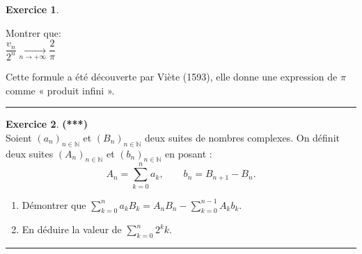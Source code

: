 \documentclass[a4paper,11pt]{article}
\theoremstyle{definition}
\newtheorem{exo}{Exercice} %
\begin{document}
\begin{minipage}[c]{1\linewidth}
\begin{minipage}[c]{0.48\linewidth}
\begin{exo}
\begin{enumerate}
				\raggedright Montrer que: \quad\\[0.25cm]
				
				\centering$ \dfrac{v_n}{2^n} \underset{n \rightarrow +\infty}{\longrightarrow} \dfrac{2}{\pi}$\quad\\[0.35cm]
				
				\raggedright Cette formule a été découverte par Viète (1593), elle donne une expression de $\pi$ comme « produit infini ».
			\end{enumerate}
			
			\raggedright
			
	
			
			\centering
			\rule{1\linewidth}{0.6pt}
		\end{exo}
	
		\begin{exo}\textbf{(***)}\quad\\[0.2cm]
			Soient $(a_n)_{n\in\mathbb N}$ et $(B_n)_{n\in\mathbb N}$ deux suites de nombres complexes. On définit deux suites $(A_n)_{n\in\mathbb N}$ et $(b_n)_{n\in\mathbb N}$ en posant :
			$$A_n=\sum_{k=0}^n a_k,\quad\quad b_n=B_{n+1}-B_n.$$
			\begin{enumerate}
				\item Démontrer que $\sum_{k=0}^n a_kB_k=A_n B_n-\sum_{k=0}^{n-1}A_kb_k.$
				\item En déduire la valeur de $\sum_{k=0}^n 2^kk$.
			\end{enumerate}
			
			\centering
			\rule{1\linewidth}{0.6pt}
		\end{exo}
		
		
		
	\end{minipage}
\end{minipage}

\newpage
\end{document}

